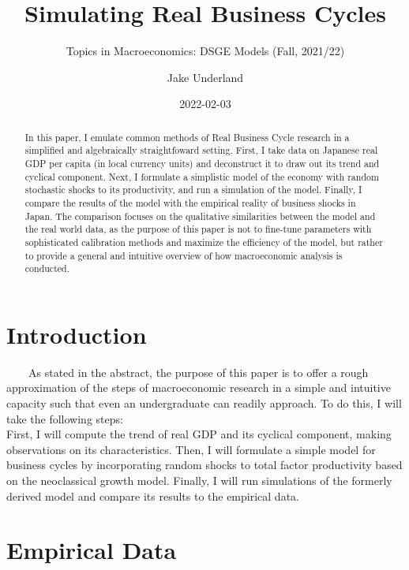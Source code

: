 \documentclass[
]{article}
\title{Simulating Real Business Cycles}
\subtitle{Topics in Macroeconomics: DSGE Models (Fall, 2021/22)}
\author{Jake Underland}
\date{2022-02-03}
\begin{document}
\maketitle

{
\setcounter{tocdepth}{2}
\tableofcontents
}
\begin{abstract}
In this paper, I emulate common methods of Real Business Cycle research in a simplified and algebraically straightfoward setting. First, I take data on Japanese real GDP per capita (in local currency units) and deconstruct it to draw out its trend and cyclical component. Next, I formulate a simplistic model of the economy with random stochastic shocks to its productivity, and run a simulation of the model. Finally, I compare the results of the model with the empirical reality of business shocks in Japan. The comparison focuses on the qualitative similarities between the model and the real world data, as the purpose of this paper is not to fine-tune parameters with sophisticated calibration methods and maximize the efficiency of the model, but rather to provide a general and intuitive overview of how macroeconomic analysis is conducted. 
\end{abstract}

\hypertarget{introduction}{%
\section{Introduction}\label{introduction}}

~~~~As stated in the abstract, the purpose of this paper is to offer a
rough approximation of the steps of macroeconomic research in a simple
and intuitive capacity such that even an undergraduate can readily
approach. To do this, I will take the following steps:\\
\hspace*{0.333em}\hspace*{0.333em}\hspace*{0.333em}\hspace*{0.333em}First,
I will compute the trend of real GDP and its cyclical component, making
observations on its characteristics. Then, I will formulate a simple
model for business cycles by incorporating random shocks to total factor
productivity based on the neoclassical growth model. Finally, I will run
simulations of the formerly derived model and compare its results to the
empirical data.

\hypertarget{empirical-data}{%
\section{Empirical Data}\label{empirical-data}}
\end{document}
